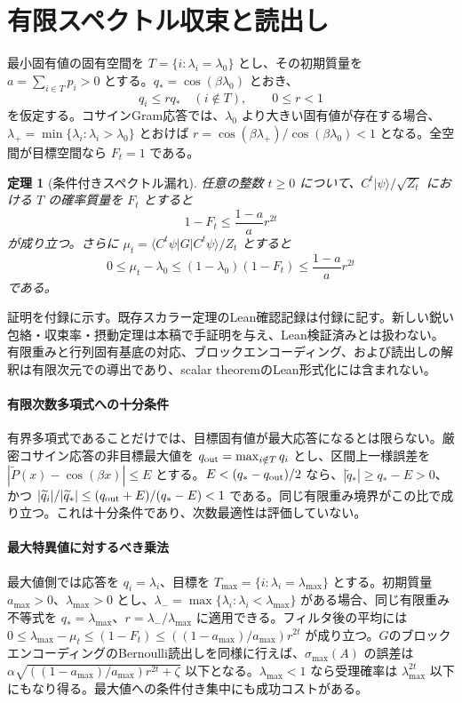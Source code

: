 \documentclass[11pt,a4paper]{article}
\newtheorem{theorem}{定理}
\newcommand{\ket}[1]{\lvert #1\rangle}
\begin{document}
{\section{有限スペクトル収束と読出し}
最小固有値の固有空間を $T=\{i:\lambda_i=\lambda_0\}$ とし、その初期質量を $a=\sum_{i\in T}p_i>0$ とする。$q_*=\cos(\beta\lambda_0)$ とおき、
\[
 q_i\leq r q_*\quad(i\notin T),\qquad 0\leq r<1
\]
を仮定する。コサインGram応答では、$\lambda_0$ より大きい固有値が存在する場合、$\lambda_+=\min\{\lambda_i:\lambda_i>\lambda_0\}$ とおけば $r=\cos(\beta\lambda_+)/\cos(\beta\lambda_0)<1$ となる。全空間が目標空間なら $F_t=1$ である。

\begin{theorem}[条件付きスペクトル漏れ]
任意の整数 $t\geq0$ について、$C^t\ket{\psi}/\sqrt{Z_t}$ における $T$ の確率質量を $F_t$ とすると
\[
 1-F_t\leq\frac{1-a}{a}r^{2t}
\]
が成り立つ。さらに $\mu_t=\langle C^t\psi|G|C^t\psi\rangle/Z_t$ とすると
\[
 0\leq\mu_t-\lambda_0
 \leq(1-\lambda_0)(1-F_t)
 \leq\frac{1-a}{a}r^{2t}
\]
である。
\end{theorem}

証明を付録に示す。既存スカラー定理のLean確認記録は付録に記す。新しい鋭い包絡・収束率・摂動定理は本稿で手証明を与え、Lean検証済みとは扱わない。有限重みと行列固有基底の対応、ブロックエンコーディング、および読出しの解釈は有限次元での導出であり、scalar theoremのLean形式化には含まれない。

\paragraph{有限次数多項式への十分条件}
有界多項式であることだけでは、目標固有値が最大応答になるとは限らない。厳密コサイン応答の非目標最大値を $q_{\rm out}=\max_{i\notin T}q_i$ とし、区間上一様誤差を $|\widetilde P(x)-\cos(\beta x)|\leq E$ とする。$E<(q_*-q_{\rm out})/2$ なら、$|\widetilde q_*|\geq q_*-E>0$、かつ $|\widetilde q_i|/|\widetilde q_*|\leq(q_{\rm out}+E)/(q_*-E)<1$ である。同じ有限重み境界がこの比で成り立つ。これは十分条件であり、次数最適性は評価していない。

\paragraph{最大特異値に対するべき乗法}
最大値側では応答を $q_i=\lambda_i$、目標を $T_{\max}=\{i:\lambda_i=\lambda_{\max}\}$ とする。初期質量 $a_{\max}>0$、$\lambda_{\max}>0$ とし、$\lambda_-=\max\{\lambda_i:\lambda_i<\lambda_{\max}\}$ がある場合、同じ有限重み不等式を $q_*=\lambda_{\max}$、$r=\lambda_-/\lambda_{\max}$ に適用できる。フィルタ後の平均には $0\leq\lambda_{\max}-\mu_t\leq(1-F_t)\leq((1-a_{\max})/a_{\max})r^{2t}$ が成り立つ。$G$のブロックエンコーディングのBernoulli読出しを同様に行えば、$\sigma_{\max}(A)$ の誤差は $\alpha\sqrt{((1-a_{\max})/a_{\max})r^{2t}+\zeta}$ 以下となる。$\lambda_{\max}<1$ なら受理確率は $\lambda_{\max}^{2t}$ 以下にもなり得る。最大値への条件付き集中にも成功コストがある。

}
\end{document}
